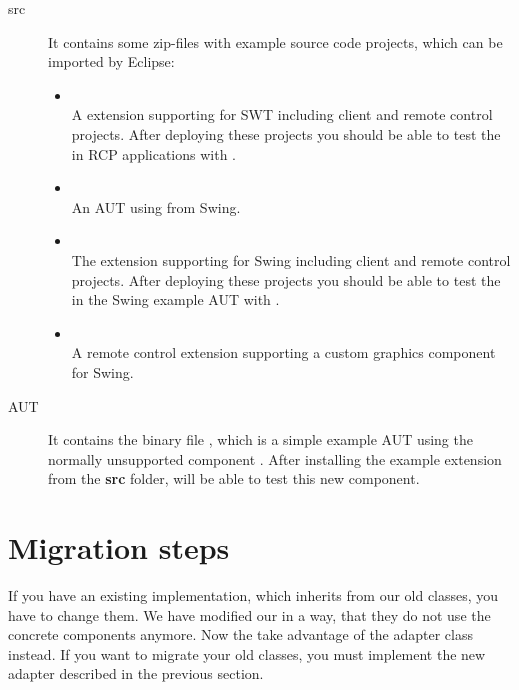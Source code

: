 \begin{description}
 \item[src] It contains some zip-files with example source code projects, which
            can be imported by Eclipse:
 \begin{itemize}
   \item {}\\
         A \app{} extension supporting  for SWT including client
         and remote control projects. After deploying these projects you should
         be able to test the  in RCP applications with \app{}.
   \item {}\\
         An AUT using  from Swing.
   \item {}\\
         The \app{} extension supporting  for Swing including
         client and remote control projects. After deploying these projects you
         should be able to test the  in the Swing example AUT
         with \app{}.
   \item {}\\
         A \app{} remote control extension supporting a custom graphics
         component for Swing.
 \end{itemize}
 \item[AUT] It contains the binary file , which is a simple
 example AUT using the normally unsupported component . After
 installing the  example extension from the \textbf{src}
 folder, \app{} will be able to test this new component.
\end{description}

\section{Migration steps}
If you have an existing implementation, which inherits from our old classes,
you have to change them. We have modified our \gdtesterclasses in a way, that they
do not use the concrete components anymore. Now the \gdtesterclasses take
advantage of the adapter class instead. If you want to migrate your old
classes, you must implement the new adapter described in the previous section.
